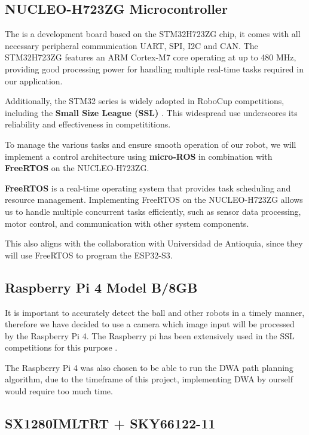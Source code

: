 \documentclass[a4paper,4pt]{article}
\begin{document}
  \subsection{NUCLEO-H723ZG Microcontroller}

  The  is a development board based on the
  STM32H723ZG chip, it comes with all necessary peripheral communication
  UART, SPI, I2C and CAN. The STM32H723ZG features an ARM Cortex-M7 core
  operating at up to 480 MHz, providing good processing power for
  handling multiple real-time tasks required in our application.

  Additionally, the STM32 series is widely adopted in RoboCup
  competitions, including the \textbf{Small Size League (SSL)} \cite{ryllExtendedTeamDescription}\cite{zhaoZJUNlictExtendedTeam}\cite{wuCompilationErrorTeam}.
  This widespread use underscores its reliability and effectiveness in
  competititions.

  To manage the various tasks and ensure smooth operation of our robot,
  we will implement a control architecture using \textbf{micro-ROS} in
  combination with \textbf{FreeRTOS} on the NUCLEO-H723ZG.

  \textbf{FreeRTOS} is a real-time operating system that provides task
  scheduling and resource management. Implementing FreeRTOS on the
  NUCLEO-H723ZG allows us to handle multiple concurrent tasks
  efficiently, such as sensor data processing, motor control, and
  communication with other system components.

  This also aligns with the collaboration with Universidad de Antioquia,
  since they will use FreeRTOS to program the ESP32-S3.

  \subsection{Raspberry Pi 4 Model B/8GB}

  It is important to accurately detect the ball and other robots in a
  timely manner, therefore we have decided to use a camera which image
  input will be processed by the Raspberry Pi 4. The Raspberry pi has
  been extensively used in the SSL competitions for this purpose
  \cite{ommerExtendedTeamDescription}\cite{satoGreenTea2024Team}.

  The Raspberry Pi 4 was also chosen to be able to run the DWA path
  planning algorithm, due to the timeframe of this project, implementing
  DWA by ourself would require too much time.

  \subsection{SX1280IMLTRT + SKY66122-11}
\end{document}
